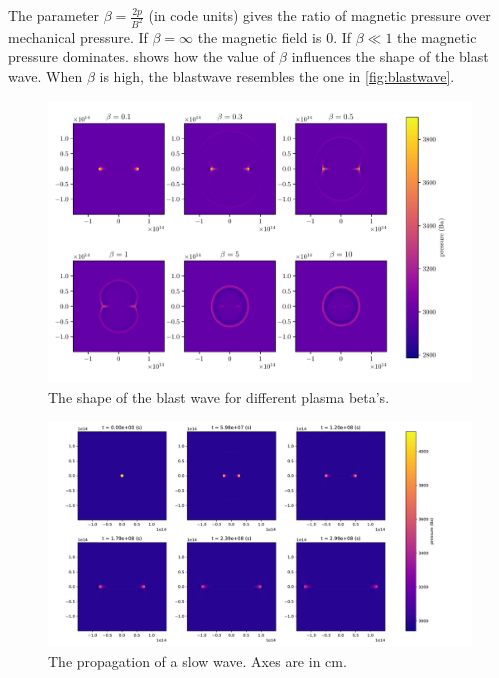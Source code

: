\documentclass[a4paper]{article}
\let\oldcap\caption
\renewcommand{\caption}[1]{\parbox{.9\linewidth}{\oldcap{#1}}}
\begin{document}
The parameter $\beta = \frac{2p}{B^2}$ (in code units) gives the ratio of magnetic pressure over mechanical pressure. 
If $\beta = \infty$ the magnetic field is $0$. 
If $\beta \ll 1$ the magnetic pressure dominates. 
 shows how the value of $\beta$ influences the shape of the blast wave. When $\beta$ is high, the blastwave resembles the one in \cref{fig:blastwave}.
\begin{figure}[H]
	\centering
	\includegraphics[width = \linewidth]{figures/influence_beta.pdf}
	\caption{The shape of the blast wave for different plasma beta's.}
\label{fig:blastwave_shape_beta}
\end{figure}


\begin{figure}[H]
	\centering
	\includegraphics[width=\textwidth]{figures/slow_wave.pdf}
	\caption{The propagation of a slow wave. Axes are in \si{cm}.}
	\label{fig:Alfven_wave}
\end{figure}
\end{document}
